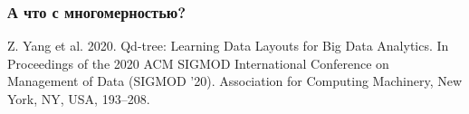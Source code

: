 \documentclass{beamer}
\begin{document}
\begin{frame}
	\frametitle{А что с многомерностью?}


Z. Yang et al. 2020. Qd-tree: Learning Data Layouts for Big Data Analytics. In Proceedings of the 2020 ACM SIGMOD International Conference on Management of Data (SIGMOD '20). Association for Computing Machinery, New York, NY, USA, 193–208. 


\end{frame}

\end{document}
